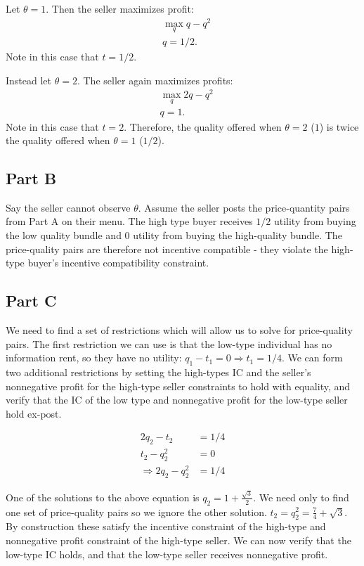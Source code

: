 \documentclass[11pt]{article} %
\begin{document}
Let $\theta = 1$. Then the seller maximizes profit:
\begin{align*}
&\max_q  q - q^2\\
&q = 1/2.
\end{align*} 
Note in this case that $t=1/2$.

Instead let $\theta = 2.$ The seller again maximizes profits:
\begin{align*}
&\max_q 2q - q^2\\
&q = 1.
\end{align*}
Note in this case that $t=2$.
Therefore, the quality offered when $\theta = 2$ ($1$) is twice the quality offered when $\theta = 1$ ($1/2$).
\subsection{Part B}
Say the seller cannot observe $\theta$. Assume the seller posts the price-quantity pairs from Part A on their menu. The high type buyer receives $1/2$ utility from buying the low quality bundle and $0$ utility from buying the high-quality bundle. The price-quality pairs are therefore not incentive compatible - they violate the high-type buyer's incentive compatibility constraint. 
\subsection{Part C}
We need to find a set of restrictions which will allow us to solve for price-quality pairs. The first restriction we can use is that the low-type individual has no information rent, so they have no utility: $q_1 - t_1 = 0 \Rightarrow t_1 = 1/4$. We can form two additional restrictions by setting the high-types IC and the seller's nonnegative profit for the high-type seller constraints to hold with equality, and verify that the IC of the low type and nonnegative profit for the low-type seller hold ex-post. 

\begin{align*}
2q_2 - t_2 &= 1/4\\
t_2 - q_2^2 &= 0\\
\Rightarrow 2q_2 - q_2^2 &= 1/4
\end{align*}

One of the solutions to the above equation is $q_2 = 1 + \frac{\sqrt{3}}{2}$. We need only to find one set of price-quality pairs so we ignore the other solution. $t_2 = q_2^2 = \frac{7}{4} + \sqrt{3}$. By construction these satisfy the incentive constraint of the high-type and nonnegative profit constraint of the high-type seller. We can now verify that the low-type IC holds, and that the low-type seller receives nonnegative profit.
\end{document}

